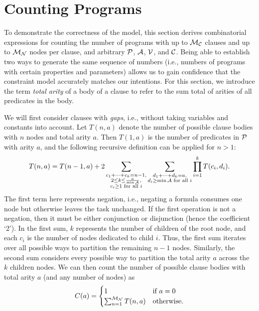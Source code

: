 \section{Counting Programs}\label{sec:counting}

To demonstrate the correctness of the model, this section derives combinatorial
expressions for counting the number of programs with up to $\mathcal{M}_{\mathcal{C}}{}$
clauses and up to $\mathcal{M}_{\mathcal{N}}{}$ nodes per clause, and arbitrary
$\mathcal{P}{}$, $\mathcal{A}{}$, $\mathcal{V}{}$, and $\mathcal{C}{}$. Being able to
establish two ways to generate the same sequence of numbers (i.e., numbers of
programs with certain properties and parameters) allows us to gain confidence
that the constraint model accurately matches our intentions. For this section,
we introduce the term \emph{total arity} of a body of a clause to refer to the
sum total of arities of all predicates in the body.

We will first consider clauses with \emph{gaps}, i.e., without taking variables
and constants into account. Let $T(n, a)$ denote the number of possible clause
bodies with $n$ nodes and total arity $a$. Then $T(1, a)$ is the number of
predicates in $\mathcal{P}{}$ with arity $a$, and the following recursive
definition can be applied for $n > 1$:
\[
  T(n, a) = T(n-1, a) + 2\sum_{\substack{c_1 + \cdots + c_k = n - 1,\\ 2 \le k
      \le \frac{a}{\min \mathcal{A}{}},\\ c_i \ge 1 \text{ for all } i}}
  \sum_{\substack{d_1 + \cdots + d_k = a,\\ d_i \ge \min \mathcal{A}{} \text{ for
        all } i}} \prod_{i=1}^k T(c_i, d_i).
\]
The first term here represents negation, i.e., negating a formula consumes
one node but otherwise leaves the task unchanged. If the first operation is not
a negation, then it must be either conjunction or disjunction (hence the
coefficient `2'). In the first sum, $k$ represents the number of children of the
root node, and each $c_i$ is the number of nodes dedicated to child $i$. Thus,
the first sum iterates over all possible ways to partition the remaining $n-1$
nodes. Similarly, the second sum considers every possible way to partition the
total arity $a$ across the $k$ children nodes. We can then count the number of
possible clause bodies with total arity $a$ (and any number of nodes) as
\[
  C(a) = \begin{cases}
    1 & \text{if } a = 0\\
    \sum_{n=1}^{\mathcal{M}_{\mathcal{N}}{}} T(n, a) & \text{otherwise.}
  \end{cases}
\]

